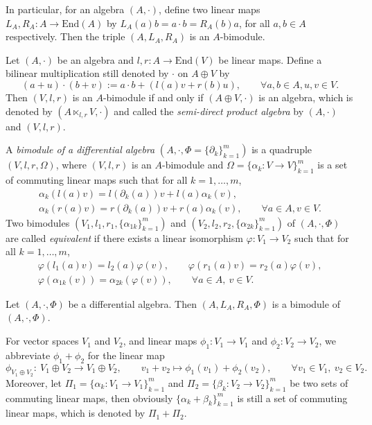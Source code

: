 \documentclass[10pt,a4paper]{amsart}
\numberwithin{equation}{section}
\newcommand{\End}{\mathrm{End}}
\begin{document}
In particular, for an algebra $(A,\cdot)$, define two linear maps $L_{A}, R_{A}\colon A \to \End(A)$ by $L_A(a)b = a \cdot b = R_A(b)a$, for all $a,b\in A$ respectively.
Then the triple $(A, L_{A}, R_{A})$ is an $A$-bimodule.

Let $(A, \cdot)$ be an algebra and $l, r\colon A \to \End (V)$ be
linear maps. Define a bilinear multiplication still denoted by
$\cdot$ on $A \oplus V$ by
\begin{equation}
 (a + u) \cdot (b + v) := a \cdot b + ( l(a) v + r(b)u ), \qquad
 \forall a, b \in A, u, v \in V. \label{eq:semiprod}
\end{equation}
Then $(V, l, r)$ is an $A$-bimodule if and only
if $(A \oplus V,\cdot)$ is an algebra, which is denoted by $(A
\ltimes_{l,r} V, \cdot)$ and called the \textit{semi-direct
product algebra} by $(A, \cdot)$ and $(V, l, r)$.

\begin{Definition}\label{def:repd}
 A \textit{bimodule of a differential algebra} $(A, \cdot, \Phi\!=\!\{\partial_k\}_{k=1}^m)$ is a quadruple $(V, l, r, \Omega)$, where $(V, l, r)$ is an $A$-bimodule and $\Omega = \{\alpha_k\colon V \to V\}_{k=1}^m$ is a set of commuting linear maps
 such that for all $k=1, \dots, m$,
 \begin{gather}
 \alpha_k( l(a)v ) = l( \partial_k(a) ) v + l(a) \alpha_k(v), \label{eq:repd1} \\
 \alpha_k( r(a)v ) = r( \partial_k(a) ) v + r(a) \alpha_k(v), \qquad
 \forall a \in A, v \in V. \label{eq:repd2}
 \end{gather}
 Two bimodules $(V_1, l_1, r_1, \{\alpha_{1k}\}_{k=1}^m)$ and $(V_2, l_2, r_2, \{\alpha_{2k}\}_{k=1}^m)$ of $(A, \cdot, \Phi)$ are called \textit{equivalent}
 if there exists a linear isomorphism $\varphi\colon V_1 \to V_2$
 such that for all $k=1, \dots, m$,
 \begin{gather*}
 \varphi( l_1(a)v ) = l_2(a) \varphi(v), \qquad
 \varphi( r_1(a)v ) = r_2(a) \varphi(v), \\
 \varphi( \alpha_{1k}(v) ) = \alpha_{2k}( \varphi(v) ), \qquad
 \forall a \in A, \ v \in V.
 \end{gather*}
\end{Definition}

\begin{Example}
 Let $(A, \cdot, \Phi)$ be a differential algebra.
 Then $(A, L_A, R_A, \Phi)$ is a bimodule of $(A, \cdot, \Phi)$.
\end{Example}

For vector spaces $V_1$ and $V_2$,
and linear maps $\phi_1\colon V_1 \to V_1$ and $\phi_2: V_2 \to V_2$,
we abbreviate $\phi_1 + \phi_2$ for the linear map
\begin{equation*}
 \phi_{V_1 \oplus V_2}\colon \ V_1 \oplus V_2 \to V_1 \oplus V_2, \qquad
 v_1 + v_2 \mapsto \phi_1(v_1) + \phi_2(v_2), \qquad
 \forall v_1 \in V_1, \ v_2 \in V_2.
\end{equation*}
Moreover, let $\Pi_1 = \{\alpha_k\colon V_1 \to V_1\}_{k=1}^m$ and $\Pi_2 = \{\beta_k\colon V_2 \to V_2\}_{k=1}^m$ be two sets of commuting linear maps,
then obviously $\{\alpha_k + \beta_k\}_{k=1}^m$ is still a set of commuting linear maps, which is denoted by $\Pi_1 + \Pi_2$.
\end{document}
